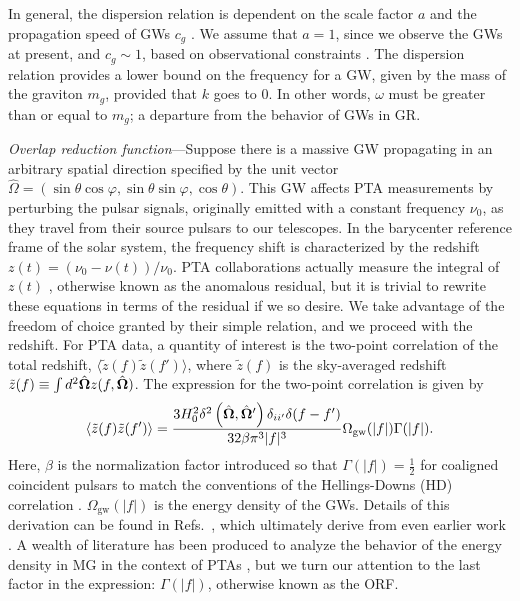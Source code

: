\documentclass[prd,twocolumn,aps,psfig,nofootinbib,nobibnotes,superscriptaddress,preprintnumbers,times]{revtex4-2}
\begin{document}
In general, the dispersion relation is dependent on the scale factor $a$ and the propagation speed of GWs $c_g$ \cite{Gumrukcuoglu:2012wt}. We assume that $a=1$, since we observe the GWs at present, and $c_g \sim  1$, based on observational constraints \cite{LIGOScientific:2017vwq, LIGOScientific:2017zic, LIGOScientific:2017ync}.
The dispersion relation provides a lower bound on the frequency for a GW, given by the mass of the graviton $m_g$, provided that $k$ goes to 0. In other words, $\omega$ must be greater than or equal to $m_g$; a departure from the behavior of GWs in GR.

\textit{Overlap reduction function}---Suppose there is a massive GW propagating in an arbitrary spatial direction specified by the unit vector $\hat{\Omega} = (\sin\theta \cos\varphi,
                        \sin\theta \sin\varphi,
                        \cos\theta)$.
This GW affects PTA measurements by perturbing the pulsar signals, originally emitted with a constant frequency $\nu_0$, as they travel from their source pulsars to our telescopes. In the barycenter reference frame of the solar system, the frequency shift is characterized by the redshift $z(t) = (\nu_0 - \nu(t))/\nu_0$. PTA collaborations actually measure the integral of $z(t)$ \cite{Anholm:2008wy, Dahal:2020}, otherwise known as the anomalous residual, but it is trivial to rewrite these equations in terms of the residual if we so desire. We take advantage of the freedom of choice granted by their simple relation, and we proceed with the redshift. For PTA data, a quantity of interest is the two-point correlation of the total redshift, $\langle \tilde{z}(f) \tilde{z}(f') \rangle$, where $\tilde{z}(f)$ is the sky-averaged redshift $\tilde{z}(f) \equiv \int d^2\hat{\bf \Omega} z(f, \hat{\bf \Omega})$. The expression for the two-point correlation is given by
\begin{equation}\label{eqn:two_point_z}
    \langle \tilde{z}(f) \tilde{z}(f') \rangle = \frac{3H_0^2\delta^2\left(\hat{\bf \Omega} , \hat{\bf \Omega}'\right)\delta_{ii'}\delta(f - f')}{32 \beta \pi^3|f|^3}\Omega_{\text{gw}}(|f|) \Gamma(|f|).
\end{equation}
Here, $\beta$ is the normalization factor introduced so that $\Gamma(|f|) = \frac{1}{2}$ for coaligned coincident pulsars to match the conventions of the Hellings-Downs (HD) correlation \cite{Romano:2023zhb}. $\Omega_{\text{gw}}(|f|)$ is the energy density of the GWs. Details of this derivation can be found in Refs.~\cite{Anholm:2008wy, Liang:2021bct}, which ultimately derive from even earlier work \cite{Detweiler:1979wn, Estabrook:1975jtn, Kaufmann:1970}. A wealth of literature has been produced to analyze the behavior of the energy density in MG in the context of PTAs \cite{Choi:2023tun, Wu:2023rib, Kenjale:2024rsc, He:2021bqm}, but we turn our attention to the last factor in the expression: $\Gamma(|f|)$, otherwise known as the ORF. 
\end{document}
